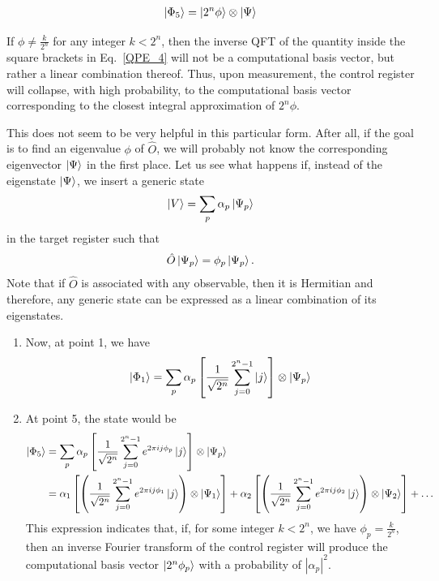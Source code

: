 \documentclass[12pt,oneside]{book}
\begin{document}
\begin{enumerate}
    \begin{align}
        \ket{\Phi_5}=\ket{2^n\phi}\otimes\ket{\Psi}
    \end{align}
    
    If $\phi \neq \frac{k}{2^n}$ for any integer $k<2^n$, then the inverse QFT of the  quantity inside the square brackets in Eq.~\ref{QPE_4} will not be a computational basis vector, but rather a linear combination thereof. Thus, upon measurement, the control register will collapse, with high probability, to the computational basis vector corresponding to the closest integral approximation of $2^n\phi$.
\end{enumerate}

This does not seem to be very helpful in this particular form. After all, if the goal is to find an eigenvalue $\phi$ of $\hat{O}$, we will probably not know the corresponding eigenvector $\ket{\Psi}$ in the first place. Let us see what happens if, instead of the eigenstate $\ket{\Psi}$, we insert a generic state
\begin{align}
    \ket{V}=\sum_p \alpha_p\ket{\Psi_p}
\end{align}
in the target register such that
\begin{align}
    \hat{O}\ket{\Psi_p}=\phi_p\ket{\Psi_p}.
\end{align}
Note that if $\hat{O}$ is associated with any observable, then it is Hermitian and therefore, any generic state can be expressed as a linear combination of its eigenstates.
\begin{enumerate}
    \item Now, at point 1, we have
    \begin{align*}
        \ket{\Phi_1}=\sum_p \alpha_p \left[\frac{1}{\sqrt{2^n}}\sum_{j=0}^{2^n-1}\ket{j}\right]\otimes\ket{\Psi_p}
    \end{align*}
    \item At point 5, the state would be
    \begin{align*}
        \ket{\Phi_5} &{} =\sum_p \alpha_p \left[\frac{1}{\sqrt{2^n}} \sum_{j=0}^{2^n-1}e^{2\pi i j \phi_p}\ket{j}\right]\otimes\ket{\Psi_p}\\
        &{} = \alpha_1 \left[\left(\frac{1}{\sqrt{2^n}} \sum_{j=0}^{2^n-1}e^{2\pi i j \phi_1}\ket{j}\right)\otimes\ket{\Psi_1}\right] + \alpha_2 \left[\left(\frac{1}{\sqrt{2^n}} \sum_{j=0}^{2^n-1}e^{2\pi i j \phi_2}\ket{j}\right)\otimes\ket{\Psi_2}\right] + \hdots
    \end{align*}
    This expression indicates that, if, for some integer $k<2^n$, we have $\phi_p=\frac{k}{2^n}$, then an inverse Fourier transform of the control register will produce the computational basis vector $\ket{2^n\phi_p}$ with a probability of $|\alpha_p|^2$.
\end{enumerate}
\end{document}
